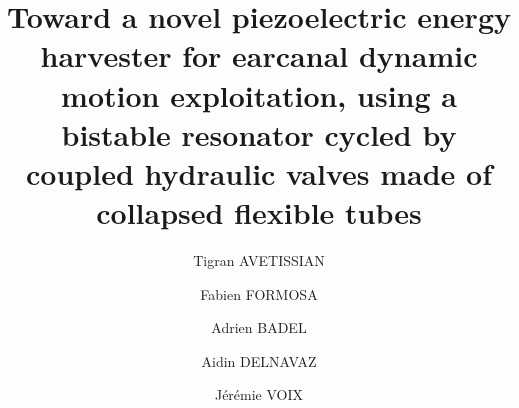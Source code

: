 \documentclass[3p,twocolumn,preprint]{elsarticle}
\begin{document}
\tableofcontents

\begin{frontmatter}



\title{Toward a novel piezoelectric energy harvester for earcanal dynamic motion exploitation, using a bistable resonator cycled by coupled hydraulic valves made of collapsed flexible tubes}



\address[symme]{Laboratoire SYMME - Université Savoie Mont Blanc, 7 Chemin de Bellevue, 74940, Annecy}
\address[critias]{Université du Québec - École de technologie supérieure, Montréal, QC, H3C 1K3}


\author[symme]{Tigran AVETISSIAN}
\author[symme]{Fabien FORMOSA}
\author[symme]{Adrien BADEL}

\author[critias]{Aidin DELNAVAZ}
\author[critias]{Jérémie VOIX}



\end{frontmatter}
\end{document}
